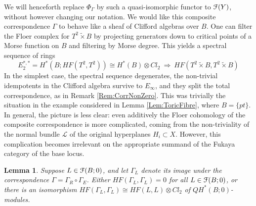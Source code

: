 \documentclass[reqno,10pt]{amsart}
\numberwithin{equation}{section}
\newcommand{\scrF}{\EuScript{F}}
\newtheorem{Lemma}[thm]{Lemma}
\theoremstyle{remark}
\begin{document}
We will henceforth replace $\Phi_{\Gamma}$ by such a quasi-isomorphic functor to $\scrF(Y)$, without however changing our notation.
We would like this composite correspondence $\Gamma$ to behave like a sheaf of Clifford algebras over $B$.  One can filter the Floer complex for $T^2 \tilde{\times} B$ by projecting generators down to critical points of a Morse function on $B$ and filtering by Morse degree.  This yields a spectral sequence of rings
 \[
E_2^{*,*} =  H^*(B; HF(T^2,T^2))\cong H^*(B)\otimes Cl_2\  \Rightarrow \ HF(T^2\tilde{\times} B, T^2\tilde{\times} B)
 \]
In the simplest case, the spectral sequence degenerates,  the non-trivial idempotents in the Clifford algebra survive to $E_{\infty}$, and they split the total correspondence,  as in Remark \ref{Rem:CorrNonZero}.  This was trivially the situation in the example considered in Lemma \ref{Lem:ToricFibre}, where $B=\{pt\}$.  In general, the picture is less clear: even additively the Floer cohomology of the composite correspondence is more complicated, coming from the non-triviality of the normal bundle $\mathcal{L}$ of the original hyperplanes $H_i \subset X$.  However, this complication becomes irrelevant on the appropriate summand of the Fukaya category of the base locus. 

\begin{Lemma} \label{Lem:FirstCorrSplits}
Suppose $L \in \scrF(B;0)$, and let $\Gamma_L$ denote its image under the correspondence $\Gamma = \Gamma_R \circ \Gamma_E$. Either $HF(\Gamma_L, \Gamma_L) = 0$ for all $L \in \scrF(B;0)$, or 
  there is an isomorphism $HF(\Gamma_L, \Gamma_L) \cong HF(L,L) \otimes Cl_2$ of $QH^*(B;0)$-modules.  
\end{Lemma}
\end{document}
